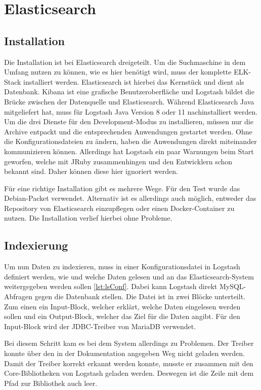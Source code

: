 
\section{Elasticsearch}

\subsection{Installation}

Die Installation ist bei Elasticsearch dreigeteilt. Um die Suchmaschine in dem Umfang nutzen zu können, wie es hier benötigt wird, muss der komplette ELK-Stack installiert werden. Elasticsearch ist hierbei das Kernstück und dient als Datenbank. Kibana ist eine grafische Benutzeroberfläche und Logstash bildet die Brücke zwischen der Datenquelle und Elasticsearch. Während Elasticsearch Java mitgeliefert hat, muss für Logstash Java Version 8 oder 11 nachinstalliert werden. Um die drei Dienste für den Development-Modus zu installieren, müssen nur die Archive entpackt und die entsprechenden Anwendungen gestartet werden. Ohne die Konfigurationsdateien zu ändern, haben die Anwendungen direkt miteinander kommunizieren können. Allerdings hat Logstash ein paar Warnungen beim Start geworfen, welche mit JRuby zusammenhingen und den Entwicklern schon bekannt sind. Daher können diese hier ignoriert werden.

Für eine richtige Installation gibt es mehrere Wege. Für den Test wurde das Debian-Packet verwendet. Alternativ ist es allerdings auch möglich, entweder das Repository von Elasticsearch einzupflegen oder einen Docker-Container zu nutzen. Die Installation verlief hierbei ohne Probleme.

\subsection{Indexierung}
\label{elaVgl:index}

Um nun Daten zu indexieren, muss in einer Konfigurationsdatei in Logstash definiert werden, wie und welche Daten gelesen und an das Elasticsearch-System weitergegeben werden sollen \ref{lst:lsConf}. Dabei kann Logstash direkt MySQL-Abfragen gegen die Datenbank stellen. Die Datei ist in zwei Blöcke unterteilt. Zum einen ein Input-Block, welcher erklärt, welche Daten eingelesen werden sollen und ein Output-Block, welcher das Ziel für die Daten angibt. Für den Input-Block wird der JDBC-Treiber von MariaDB verwendet.

Bei diesem Schritt kam es bei dem System allerdings zu Problemen. Der Treiber konnte über den in der Dokumentation angegeben Weg nicht geladen werden. Damit der Treiber korrekt erkannt werden konnte, musste er zusammen mit den Core-Bibliotheken von Logstash geladen werden. Deswegen ist die Zeile mit dem Pfad zur Bibliothek auch leer. 

